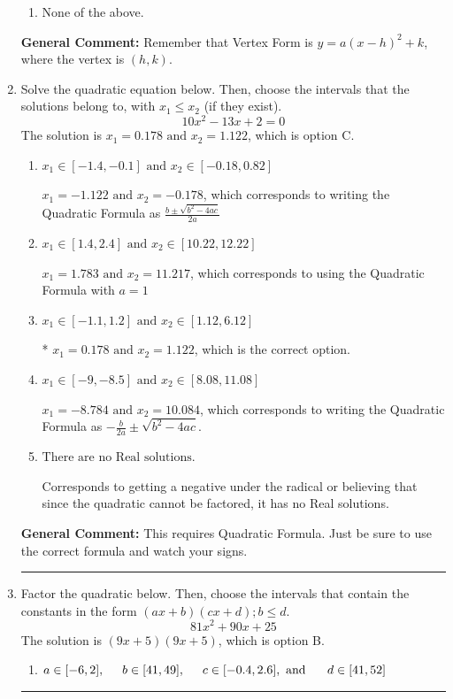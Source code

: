 \documentclass{extbook}[14pt]
\newcommand{\litem}[1]{\item #1

\rule{\textwidth}{0.4pt}}
\begin{document}
\begin{enumerate}
{\begin{enumerate}[label=\Alph*.]
\begin{multicols}{2}
\end{multicols}\item None of the above.\end{enumerate}
\textbf{General Comment:} Remember that Vertex Form is $y = a(x-h)^2+k$, where the vertex is $(h, k)$.
}
\litem{
Solve the quadratic equation below. Then, choose the intervals that the solutions belong to, with $x_1 \leq x_2$ (if they exist).
\[ 10x^{2} -13 x + 2 = 0 \]The solution is \( x_1 = 0.178 \text{ and } x_2 = 1.122 \), which is option C.\begin{enumerate}[label=\Alph*.]
\item \( x_1 \in [-1.4, -0.1] \text{ and } x_2 \in [-0.18, 0.82] \)

 $x_1 = -1.122 \text{ and } x_2 = -0.178$, which corresponds to writing the Quadratic Formula as $\frac{b \pm \sqrt{b^2 - 4ac}}{2a}$
\item \( x_1 \in [1.4, 2.4] \text{ and } x_2 \in [10.22, 12.22] \)

 $x_1 = 1.783 \text{ and } x_2 = 11.217$, which corresponds to using the Quadratic Formula with $a=1$
\item \( x_1 \in [-1.1, 1.2] \text{ and } x_2 \in [1.12, 6.12] \)

* $x_1 = 0.178 \text{ and } x_2 = 1.122$, which is the correct option.
\item \( x_1 \in [-9, -8.5] \text{ and } x_2 \in [8.08, 11.08] \)

 $x_1 = -8.784 \text{ and } x_2 = 10.084$, which corresponds to writing the Quadratic Formula as $-\frac{b}{2a} \pm \sqrt{b^2 - 4ac}$.
\item \( \text{There are no Real solutions.} \)

Corresponds to getting a negative under the radical or believing that since the quadratic cannot be factored, it has no Real solutions.
\end{enumerate}

\textbf{General Comment:} This requires Quadratic Formula. Just be sure to use the correct formula and watch your signs.
}
\litem{
Factor the quadratic below. Then, choose the intervals that contain the constants in the form $(ax+b)(cx+d); b \leq d.$
\[ 81x^{2} +90 x + 25 \]The solution is \( (9x + 5)(9x + 5) \), which is option B.\begin{enumerate}[label=\Alph*.]
\item \( a \in [-6, 2], \hspace*{5mm} b \in [41, 49], \hspace*{5mm} c \in [-0.4, 2.6], \text{ and } \hspace*{5mm} d \in [41, 52] \)


\end{enumerate}}
\end{enumerate}
\end{document}
